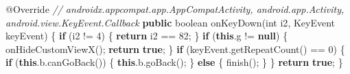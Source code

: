\documentclass[
]{article}
\newenvironment{Shaded}{}{}
\newcommand{\AttributeTok}[1]{\textcolor[rgb]{0.49,0.56,0.16}{#1}}
\newcommand{\BuiltInTok}[1]{\textcolor[rgb]{0.00,0.50,0.00}{#1}}
\newcommand{\CommentTok}[1]{\textcolor[rgb]{0.38,0.63,0.69}{\textit{#1}}}
\newcommand{\ControlFlowTok}[1]{\textcolor[rgb]{0.00,0.44,0.13}{\textbf{#1}}}
\newcommand{\DataTypeTok}[1]{\textcolor[rgb]{0.56,0.13,0.00}{#1}}
\newcommand{\DecValTok}[1]{\textcolor[rgb]{0.25,0.63,0.44}{#1}}
\newcommand{\FunctionTok}[1]{\textcolor[rgb]{0.02,0.16,0.49}{#1}}
\newcommand{\KeywordTok}[1]{\textcolor[rgb]{0.00,0.44,0.13}{\textbf{#1}}}
\newcommand{\NormalTok}[1]{#1}
\newcommand{\OperatorTok}[1]{\textcolor[rgb]{0.40,0.40,0.40}{#1}}
\begin{document}
\begin{Shaded}
\begin{Highlighting}[]
    \AttributeTok{@Override} \CommentTok{// androidx.appcompat.app.AppCompatActivity, android.app.Activity, android.view.KeyEvent.Callback}
    \KeywordTok{public} \DataTypeTok{boolean} \FunctionTok{onKeyDown}\OperatorTok{(}\DataTypeTok{int}\NormalTok{ i2}\OperatorTok{,} \BuiltInTok{KeyEvent}\NormalTok{ keyEvent}\OperatorTok{)} \OperatorTok{\{}
        \ControlFlowTok{if} \OperatorTok{(}\NormalTok{i2 }\OperatorTok{!=} \DecValTok{4}\OperatorTok{)} \OperatorTok{\{}
            \ControlFlowTok{return}\NormalTok{ i2 }\OperatorTok{==} \DecValTok{82}\OperatorTok{;}
        \OperatorTok{\}}
        \ControlFlowTok{if} \OperatorTok{(}\KeywordTok{this}\OperatorTok{.}\FunctionTok{g} \OperatorTok{!=} \KeywordTok{null}\OperatorTok{)} \OperatorTok{\{}
            \FunctionTok{onHideCustomViewX}\OperatorTok{();}
            \ControlFlowTok{return} \KeywordTok{true}\OperatorTok{;}
        \OperatorTok{\}}
        \ControlFlowTok{if} \OperatorTok{(}\NormalTok{keyEvent}\OperatorTok{.}\FunctionTok{getRepeatCount}\OperatorTok{()} \OperatorTok{==} \DecValTok{0}\OperatorTok{)} \OperatorTok{\{}
            \ControlFlowTok{if} \OperatorTok{(}\KeywordTok{this}\OperatorTok{.}\FunctionTok{b}\OperatorTok{.}\FunctionTok{canGoBack}\OperatorTok{())} \OperatorTok{\{}
                \KeywordTok{this}\OperatorTok{.}\FunctionTok{b}\OperatorTok{.}\FunctionTok{goBack}\OperatorTok{();}
            \OperatorTok{\}} \ControlFlowTok{else} \OperatorTok{\{}
                \FunctionTok{finish}\OperatorTok{();}
            \OperatorTok{\}}
        \OperatorTok{\}}
        \ControlFlowTok{return} \KeywordTok{true}\OperatorTok{;}
    \OperatorTok{\}}


\end{Highlighting}
\end{Shaded}
\end{document}
